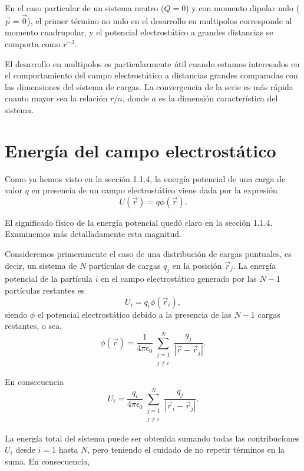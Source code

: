 \documentclass[12pt,a4paper]{book}
\begin{document}
En el caso particular de un sistema neutro ($Q = 0$) y con momento dipolar nulo ($\vec{p} = \vec{0}$), el primer término no nulo en el desarrollo en multipolos corresponde al momento cuadrupolar, y el potencial electrostático a grandes distancias se comporta como $r^{-3}$.

El desarrollo en multipolos es particularmente útil cuando estamos interesados en el comportamiento del campo electrostático a distancias grandes comparadas con las dimensiones del sistema de cargas. La convergencia de la serie es más rápida cuanto mayor sea la relación $r/a$, donde $a$ es la dimensión característica del sistema.

\section{Energía del campo electrostático}

Como ya hemos visto en la sección 1.1.4, la energía potencial de una carga de valor $q$ en presencia de un campo electrostático viene dada por la expresión
\begin{equation}
U(\vec{r}) = q\phi(\vec{r}).
\end{equation}

El significado físico de la energía potencial quedó claro en la sección 1.1.4. Examinemos más detalladamente esta magnitud.

Consideremos primeramente el caso de una distribución de cargas puntuales, es decir, un sistema de $N$ partículas de cargas $q_j$ en la posición $\vec{r}_j$. La energía potencial de la partícula $i$ en el campo electrostático generado por las $N - 1$ partículas restantes es
\begin{equation}
U_i = q_i\phi(\vec{r}_i),
\end{equation}
siendo $\phi$ el potencial electrostático debido a la presencia de las $N - 1$ cargas restantes, o sea,
\begin{equation}
\phi(\vec{r}) = \frac{1}{4\pi\epsilon_0}\sum_{\substack{j=1 \\ j\neq i}}^{N}\frac{q_j}{|\vec{r} - \vec{r}_j|}.
\end{equation}

En consecuencia
\begin{equation}
U_i = \frac{q_i}{4\pi\epsilon_0}\sum_{\substack{j=1 \\ j\neq i}}^{N}\frac{q_j}{|\vec{r}_i - \vec{r}_j|}.
\end{equation}

La energía total del sistema puede ser obtenida sumando todas las contribuciones $U_i$ desde $i = 1$ hasta $N$, pero teniendo el cuidado de no repetir términos en la suma. En consecuencia,
\end{document}
